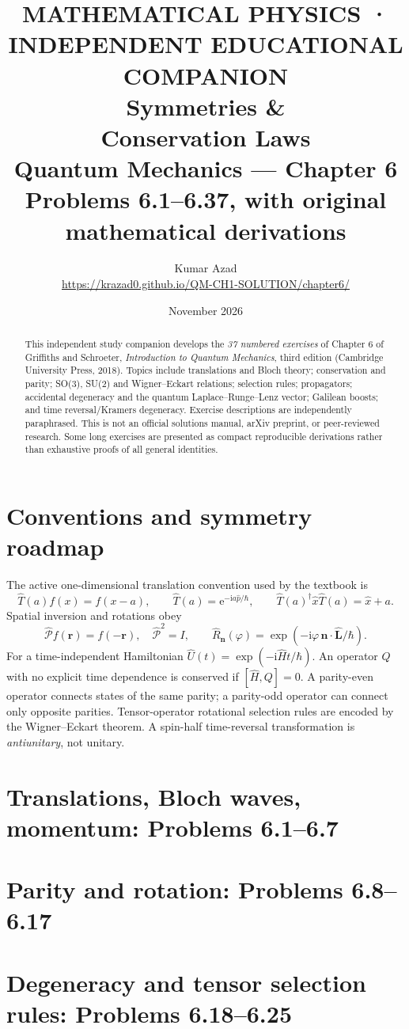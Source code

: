\documentclass[11pt,a4paper]{article}
\title{{\color{accent}\small MATHEMATICAL PHYSICS · INDEPENDENT EDUCATIONAL COMPANION}\\[12pt]
\Huge\bfseries Symmetries \&\\ Conservation Laws\\[10pt]
\Large Quantum Mechanics — Chapter 6\\[9pt]
\normalsize Problems 6.1--6.37, with original mathematical derivations}
\author{Kumar Azad\\
\small \url{https://krazad0.github.io/QM-CH1-SOLUTION/chapter6/}}
\date{November 2026}
\numberwithin{equation}{section}
\newcommand{\hb}{\hbar}
\newcommand{\ii}{\mathrm i}
\newcommand{\ee}{\mathrm e}
\newcommand{\T}{\hat T}
\newcommand{\PP}{\hat{\mathcal P}}
\newcommand{\RR}{\hat R}
\newcommand{\UU}{\hat U}
\newcommand{\HH}{\hat H}
\newcommand{\LL}{\hat{\mathbf L}}
\newcommand{\x}{\hat x}
\newcommand{\p}{\hat p}
\begin{document}
\maketitle
\begin{abstract}
This independent study companion develops the \emph{37 numbered
exercises} of Chapter 6 of Griffiths and Schroeter,
\emph{Introduction to Quantum Mechanics}, third edition
(Cambridge University Press, 2018). Topics include translations
and Bloch theory; conservation and parity; SO(3), SU(2) and
Wigner--Eckart relations; selection rules; propagators;
accidental degeneracy and the quantum Laplace--Runge--Lenz
vector; Galilean boosts; and time reversal/Kramers degeneracy.
Exercise descriptions are independently paraphrased. This is
not an official solutions manual, arXiv preprint, or peer-reviewed
research. Some long exercises are presented as compact
reproducible derivations rather than exhaustive proofs
of all general identities.
\end{abstract}
\tableofcontents
\clearpage
\section{Conventions and symmetry roadmap}
The active one-dimensional translation convention used by
the textbook is
\[
\T(a)f(x)=f(x-a),\qquad
\T(a)=\ee^{-\ii a\p/\hb},\qquad
\T(a)^\dagger \x\T(a)=\x+a.
\]
Spatial inversion and rotations obey
\[
\PP f(\mathbf r)=f(-\mathbf r),\quad
\PP^2=I,\qquad
\RR_{\mathbf n}(\varphi)=
\exp(-\ii\varphi\,\mathbf n\cdot\LL/\hb).
\]
For a time-independent Hamiltonian
$\UU(t)=\exp(-\ii\HH t/\hb)$.
An operator $Q$ with no explicit time
dependence is conserved if $[\HH,Q]=0$.
A parity-even operator connects
states of the same parity; a parity-odd
operator can connect only opposite parities.
Tensor-operator rotational selection rules
are encoded by the Wigner--Eckart theorem.
A spin-half time-reversal transformation
is \emph{antiunitary}, not unitary.
\section{Translations, Bloch waves, momentum: Problems 6.1--6.7}

\section{Parity and rotation: Problems 6.8--6.17}

\section{Degeneracy and tensor selection rules: Problems 6.18--6.25}

\end{document}
